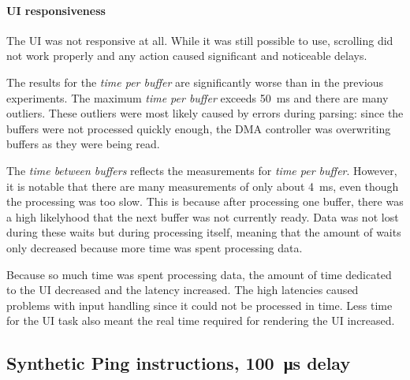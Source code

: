 \paragraph{UI responsiveness}

The UI was not responsive at all. While it was still possible to use, scrolling did not work properly
and any action caused significant and noticeable delays.
\bigbreak

The results for the \textit{time per buffer} are significantly worse than in the previous experiments.
The maximum \textit{time per buffer} exceeds \SI{50}{\milli\second} and there are many outliers.
These outliers were most likely caused by errors during parsing: since the buffers were not processed
quickly enough, the DMA controller was overwriting buffers as they were being read.

The \textit{time between buffers} reflects the measurements for \textit{time per buffer}. However,
it is notable that there are many measurements of only about \SI{4}{\milli\second}, even though the
processing was too slow. This is because after processing one buffer, there was a high likelyhood
that the next buffer was not currently ready. Data was not lost during these waits but during
processing itself, meaning that the amount of waits only decreased because more time was spent
processing data.

Because so much time was spent processing data, the amount of time dedicated to the UI decreased and
the latency increased. The high latencies caused problems with input handling since it could not be
processed in time. Less time for the UI task also meant the real time required for rendering the UI
increased.

\subsection{Synthetic Ping instructions, \SI{100}{\micro\second} delay}
\label{evaluation/results/synthetic-ping-instructions-100us-delay}

